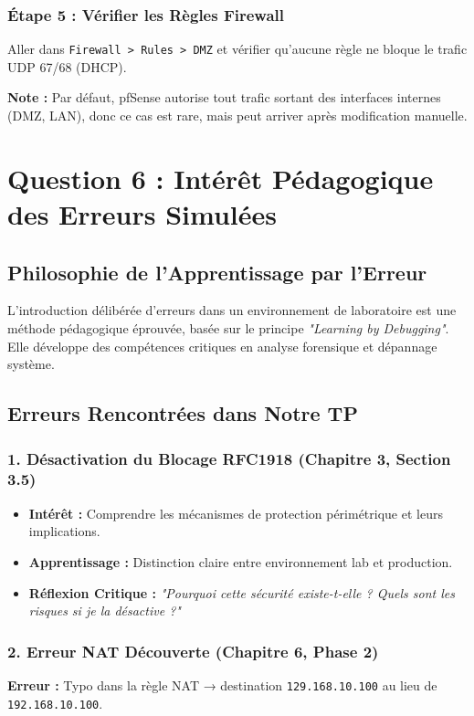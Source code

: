 \documentclass[12pt,a4paper,openany]{report}
\begin{document}
	\subsubsection{Étape 5 : Vérifier les Règles Firewall}
	Aller dans \texttt{Firewall > Rules > DMZ} et vérifier qu'aucune règle ne bloque le trafic UDP 67/68 (DHCP).
	
	\textbf{Note :} Par défaut, pfSense autorise tout trafic sortant des interfaces internes (DMZ, LAN), donc ce cas est rare, mais peut arriver après modification manuelle.
	
	\section{Question 6 : Intérêt Pédagogique des Erreurs Simulées}
	
	\subsection{Philosophie de l'Apprentissage par l'Erreur}
	L'introduction délibérée d'erreurs dans un environnement de laboratoire est une méthode pédagogique éprouvée, basée sur le principe \textit{"Learning by Debugging"}. Elle développe des compétences critiques en analyse forensique et dépannage système.
	
	\subsection{Erreurs Rencontrées dans Notre TP}
	
	\subsubsection{1. Désactivation du Blocage RFC1918 (Chapitre 3, Section 3.5)}
	\begin{itemize}
		\item \textbf{Intérêt :} Comprendre les mécanismes de protection périmétrique et leurs implications.
		\item \textbf{Apprentissage :} Distinction claire entre environnement lab et production.
		\item \textbf{Réflexion Critique :} \textit{"Pourquoi cette sécurité existe-t-elle ? Quels sont les risques si je la désactive ?"}
	\end{itemize}
	
	\subsubsection{2. Erreur NAT Découverte (Chapitre 6, Phase 2)}
	\textbf{Erreur :} Typo dans la règle NAT → destination \texttt{129.168.10.100} au lieu de \texttt{192.168.10.100}.
	
\end{document}
